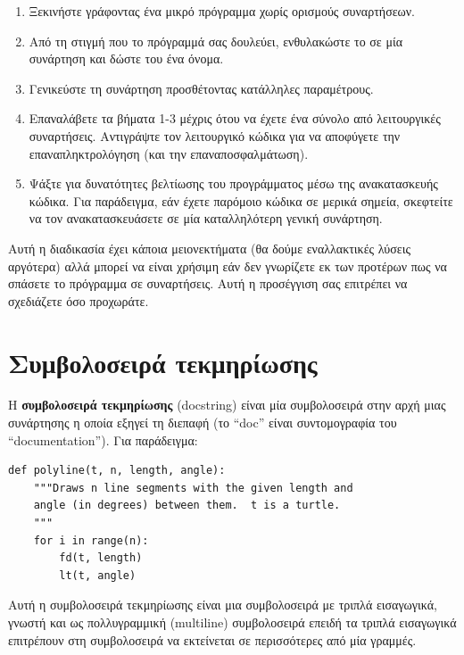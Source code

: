\documentclass[10pt]{book}
\begin{document}
\begin{enumerate}

\item Ξεκινήστε γράφοντας ένα μικρό πρόγραμμα χωρίς ορισμούς συναρτήσεων.

\item Από τη στιγμή που το πρόγραμμά σας δουλεύει, ενθυλακώστε το σε μία
συνάρτηση και δώστε του ένα όνομα.

\item Γενικεύστε τη συνάρτηση προσθέτοντας κατάλληλες παραμέτρους.

\item Επαναλάβετε τα βήματα 1-3 μέχρις ότου να έχετε ένα σύνολο από λειτουργικές συναρτήσεις. Αντιγράψτε τον λειτουργικό κώδικα για να αποφύγετε την επαναπληκτρολόγηση (και την επαναποσφαλμάτωση).

\item Ψάξτε για δυνατότητες βελτίωσης του προγράμματος μέσω της ανακατασκευής κώδικα. Για παράδειγμα, εάν έχετε παρόμοιο κώδικα σε μερικά σημεία, σκεφτείτε να τον ανακατασκευάσετε σε μία καταλληλότερη γενική συνάρτηση.

\end{enumerate}

Αυτή η διαδικασία έχει κάποια μειονεκτήματα (θα δούμε εναλλακτικές λύσεις αργότερα) αλλά μπορεί να είναι χρήσιμη εάν δεν γνωρίζετε εκ των προτέρων πως να σπάσετε το πρόγραμμα σε συναρτήσεις. Αυτή η προσέγγιση σας επιτρέπει να σχεδιάζετε όσο προχωράτε.


\section{Συμβολοσειρά τεκμηρίωσης}
\label{docstring}

Η {\bf συμβολοσειρά τεκμηρίωσης} (docstring) είναι μία συμβολοσειρά στην αρχή μιας συνάρτησης η οποία εξηγεί τη διεπαφή (το ``doc'' είναι συντομογραφία του ``documentation''). Για παράδειγμα:


\begin{verbatim}
def polyline(t, n, length, angle):
    """Draws n line segments with the given length and
    angle (in degrees) between them.  t is a turtle.
    """
    for i in range(n):
        fd(t, length)
        lt(t, angle)
\end{verbatim}
%

Αυτή η συμβολοσειρά τεκμηρίωσης είναι μια συμβολοσειρά με τριπλά εισαγωγικά,
γνωστή και ως πολλυγραμμική (multiline) συμβολοσειρά επειδή τα τριπλά εισαγωγικά επιτρέπουν στη συμβολοσειρά να εκτείνεται σε περισσότερες από μία γραμμές.
\end{document}
